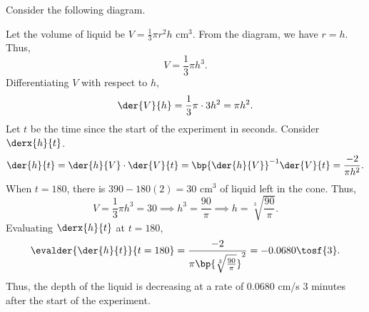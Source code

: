 \begin{solution}
    Consider the following diagram.

    \begin{center}
    \end{center}

    Let the volume of liquid be $V = \frac13 \pi r^2 h$ cm$^3$. From the diagram, we have $r = h$. Thus, \[V = \frac13 \pi h^3.\] Differentiating $V$ with respect to $h$, \[\der{V}{h} = \frac13 \pi \cdot 3 h^2 = \pi h^2.\] Let $t$ be the time since the start of the experiment in seconds. Consider $\derx{h}{t}$. \[\der{h}{t} = \der{h}{V} \cdot \der{V}{t} = \bp{\der{h}{V}}^{-1} \der{V}{t} = \frac{-2}{\pi h^2}.\] When $t = 180$, there is $390 - 180(2) = 30$ cm$^3$ of liquid left in the cone. Thus, \[V = \frac13 \pi h^3 = 30 \implies h^3 = \frac{90}{\pi} \implies h = \sqrt[3]{\frac{90}{\pi}}.\] Evaluating $\derx{h}{t}$ at $t = 180$, \[\evalder{\der{h}{t}}{t = 180} = \frac{-2}{\pi \bp{\sqrt[3]{\frac{90}{\pi}}}^2} = -0.0680 \tosf{3}.\] Thus, the depth of the liquid is decreasing at a rate of 0.0680 cm/s 3 minutes after the start of the experiment.
\end{solution}

